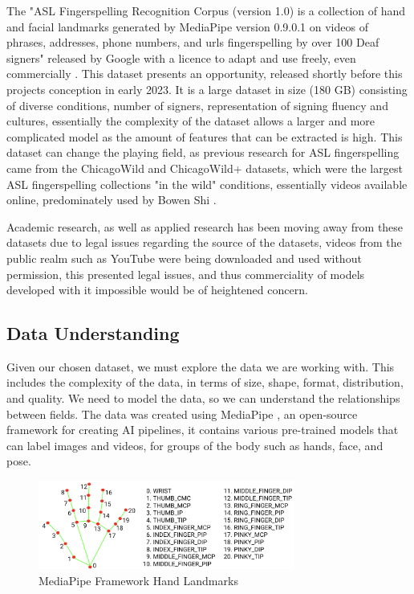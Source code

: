 \documentclass[preprint,11pt,review,authoryear]{elsarticle}
\begin{document}
The "ASL Fingerspelling Recognition Corpus (version 1.0) is a collection of hand and facial landmarks generated by MediaPipe version 0.9.0.1 on videos of phrases, addresses, phone numbers, and urls fingerspelling by over 100 Deaf signers" \citep{asl-fingerspelling} released by Google with a licence to adapt and use freely, even commercially \citep{CCDeedAttribution}. This dataset presents an opportunity, released shortly before this projects conception in early 2023. It is a large dataset in size (180 GB) consisting of diverse conditions, number of signers, representation of signing fluency and cultures, essentially the complexity of the dataset allows a larger and more complicated model as the amount of features that can be extracted is high. This dataset can change the playing field, as previous research for ASL fingerspelling came from the ChicagoWild \citep{fs18slt} and ChicagoWild+ \citep{fs18iccv} datasets, which were the largest ASL fingerspelling collections "in the wild" conditions, essentially videos available online, predominately used by Bowen Shi \citep{shiAmericanSignLanguage2018}. 

Academic research, as well as applied research has been moving away from these datasets due to legal issues regarding the source of the datasets, videos from the public realm such as YouTube were being downloaded and used without permission, this presented legal issues, and thus commerciality of models developed with it impossible would be of heightened concern.


\subsection{Data Understanding}

Given our chosen dataset, we must explore the data we are working with. This includes the complexity of the data, in terms of size, shape, format, distribution, and quality. We need to model the data, so we can understand the relationships between fields. The data was created using MediaPipe \citep{lugaresiMediaPipeFrameworkBuilding2019}, an open-source framework for creating AI pipelines, it contains various pre-trained models that can label images and videos, for groups of the body such as hands, face, and pose.

\begin{figure}[h]
    \centering
    \includegraphics[width=0.75\textwidth]{images/hand-landmarks.png}
    \caption{MediaPipe Framework Hand Landmarks \citep{lugaresiMediaPipeFrameworkBuilding2019}}
    \label{fig:handlandmark1}
\end{figure}
\end{document}
